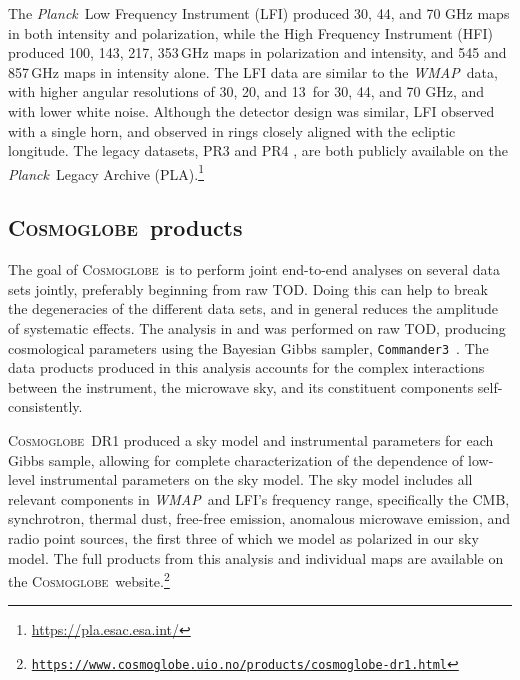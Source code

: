 \documentclass[twocolumn]{../../common/aa}
\def\WMAP{\emph{WMAP}}
\def\Planck{\emph{Planck}}
\def\commanderthree{\texttt{Commander3}}
\newcommand{\cosmoglobe}{\textsc{Cosmoglobe}}
\newcommand{\Cosmoglobe}{\textsc{Cosmoglobe}}
\begin{document}
The \Planck\ Low Frequency Instrument (LFI) produced  30, 44, and 70 GHz maps in both intensity and polarization, while the High Frequency Instrument (HFI) produced 100, 143, 217, 353\,GHz maps in polarization and intensity, and 545 and 857\,GHz maps in intensity alone. The LFI data are similar to the \WMAP\ data, with higher angular resolutions of 30\arcm, 20\arcm, and 13\arcm\ for 30, 44, and 70 GHz, and with lower white noise. Although the detector design was similar, LFI observed with a single horn, and observed in rings closely aligned with the ecliptic longitude. The legacy datasets, PR3 \citep{planck2016-l01} and PR4 \citep{planck2020-LVII}, are both publicly available on the \Planck\ Legacy Archive (PLA).\footnote{\url{https://pla.esac.esa.int/}}

\subsection{\Cosmoglobe\ products}
\label{sec:cosmoglobe_data}

The goal of \Cosmoglobe\ is to perform joint end-to-end analyses on several data sets jointly, preferably beginning from raw TOD. Doing this can help to break the degeneracies of the different data sets, and in general reduces the amplitude of systematic effects. The analysis in \citet{bp01} and \citet{watts2023_dr1} was performed on raw TOD, producing  cosmological parameters using the Bayesian Gibbs sampler, \commanderthree\ \citep{bp03}. The data products produced in this analysis accounts for the complex interactions between the instrument, the microwave sky, and its constituent components self-consistently. %

\cosmoglobe\ DR1 produced a sky model and instrumental parameters for each Gibbs sample, allowing for complete characterization of the dependence of low-level instrumental parameters on the sky model. The sky model includes all relevant components in \WMAP\ and LFI's frequency range, specifically the CMB, synchrotron, thermal dust, free-free emission, anomalous microwave emission, and radio point sources, the first three of which we model as polarized in our sky model. The full products from this analysis and individual maps are available on the \cosmoglobe\ website.\footnote{\href{https://www.cosmoglobe.uio.no/products/cosmoglobe-dr1.html}{\texttt{https://www.cosmoglobe.uio.no/products/\newline cosmoglobe-dr1.html}}}
\end{document}
